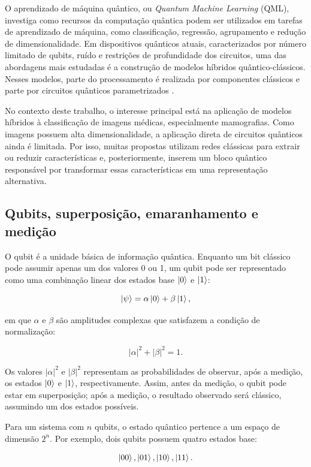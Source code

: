 \documentclass[
    12pt,
    openright,
    oneside,
    a4paper,
    english,
    brazil
]{abntex2}
\begin{document}
O aprendizado de máquina quântico, ou \textit{Quantum Machine Learning} (QML), investiga como recursos da computação quântica podem ser utilizados em tarefas de aprendizado de máquina, como classificação, regressão, agrupamento e redução de dimensionalidade. Em dispositivos quânticos atuais, caracterizados por número limitado de qubits, ruído e restrições de profundidade dos circuitos, uma das abordagens mais estudadas é a construção de modelos híbridos quântico-clássicos. Nesses modelos, parte do processamento é realizada por componentes clássicos e parte por circuitos quânticos parametrizados \cite{biamonte2017qml,preskill2018nisq,cerezo2021variational}.

No contexto deste trabalho, o interesse principal está na aplicação de modelos híbridos à classificação de imagens médicas, especialmente mamografias. Como imagens possuem alta dimensionalidade, a aplicação direta de circuitos quânticos ainda é limitada. Por isso, muitas propostas utilizam redes clássicas para extrair ou reduzir características e, posteriormente, inserem um bloco quântico responsável por transformar essas características em uma representação alternativa.

\subsection{Qubits, superposição, emaranhamento e medição}

O qubit é a unidade básica de informação quântica. Enquanto um bit clássico pode assumir apenas um dos valores 0 ou 1, um qubit pode ser representado como uma combinação linear dos estados base \(\ket{0}\) e \(\ket{1}\):

\[
\ket{\psi} = \alpha\ket{0} + \beta\ket{1},
\]

em que \(\alpha\) e \(\beta\) são amplitudes complexas que satisfazem a condição de normalização:

\[
|\alpha|^2 + |\beta|^2 = 1.
\]

Os valores \(|\alpha|^2\) e \(|\beta|^2\) representam as probabilidades de observar, após a medição, os estados \(\ket{0}\) e \(\ket{1}\), respectivamente. Assim, antes da medição, o qubit pode estar em superposição; após a medição, o resultado observado será clássico, assumindo um dos estados possíveis.

Para um sistema com \(n\) qubits, o estado quântico pertence a um espaço de dimensão \(2^n\). Por exemplo, dois qubits possuem quatro estados base:

\[
\ket{00}, \ket{01}, \ket{10}, \ket{11}.
\]
\end{document}

